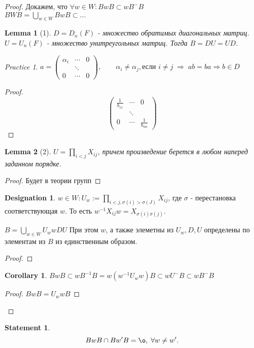 \documentclass[11pt]{book}
\theoremstyle{definition}
\theoremstyle{plain}
\theoremstyle{plain}
\newtheorem*{lm}{Lemma}
\newtheorem*{st}{Statement}
\theoremstyle{definition}
\newtheorem*{cor}{Corollary}
\newtheorem*{name}{Designation}
\theoremstyle{remark}
\newtheorem*{prac}{Practice}
\begin{document}
\begin{proof}
    Докажем, что $\forall w \in  W: BwB \subset w B^- B$ \\
    $B W B = \bigcup _{w \in  W} B w B \subset ...$%
    \begin{lm}[1]
	$D = D_n (F)$ - множество обратимых диагональных матриц. $U = U_n(F)$ - множество унитреугольных матриц. Тогда $B = D U = U D$.
    \end{lm}
    \begin{prac}
        $a = \left ( 
        \begin{array}{ccc}
	    \alpha_i & \cdots & 0 \\
	     & \ddots &\\
	    0 & \cdots & 0
        \end{array}
        \right ), \qquad \alpha _i \ne \alpha_j , \mbox{если } i \ne j \; \Rightarrow \; ab = ba \Rightarrow b \in  D$
    \end{prac}
    \begin{proof}
    $$
    \left ( 
    \begin{array}{ccc}
	\frac{1}{b_{11}} & \cdots & 0 \\
	&\ddots & \\
	0 & \cdots & \frac{1}{b_{nn}}
    \end{array}
    \right )
    $$%
    \end{proof}
    \begin{lm}[2]
	$U = \prod_{i < j} X_{ij}$, причем произведение берется в любом наперед заданном порядке.
    \end{lm}
     \begin{proof}
        Будет в теории групп
    \end{proof}
    \begin{name}
	$w \in  W : U_w := \prod_{i < j, \sigma (i) >\sigma(J)} X_{ij}$, где $\sigma$ - перестановка соответствующая $w$.
	То есть $w^{-1} X _{ij} w = X_{\sigma(i) \sigma(j)}$.
    \end{name}
    \begin{thm}
	$B = \bigcup _{w \in  W} U_w w D U$
	При этом $ w$, а также элеметны из $U_w, D, U$ определены по элементам из $B$  из единственным образом.
    \end{thm}
    \begin{proof}
    \end{proof}
    \begin{cor}
	$BwB \subset w B^{-1}B = w (w^{-1} U_w w)B \subset w U^{-} B \subset w B ^{-} B$
    \end{cor}
    \begin{proof}
        $B w B = U_w w B$
    \end{proof}
\end{proof}
\begin{st}
    \[
    B w B \cap B w ' B = \o ,\; \forall w \ne w'
    .\] 
\end{st}
\end{document}
